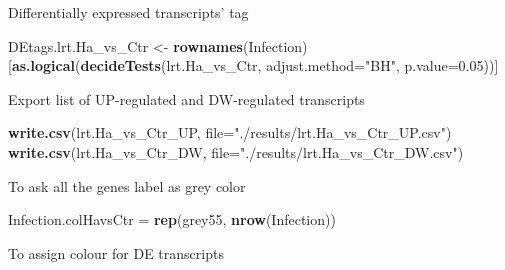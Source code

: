 \documentclass[
]{article}
\newenvironment{Shaded}{\begin{snugshade}}{\end{snugshade}}
\newcommand{\AttributeTok}[1]{\textcolor[rgb]{0.13,0.29,0.53}{#1}}
\newcommand{\DecValTok}[1]{\textcolor[rgb]{0.00,0.00,0.81}{#1}}
\newcommand{\FloatTok}[1]{\textcolor[rgb]{0.00,0.00,0.81}{#1}}
\newcommand{\FunctionTok}[1]{\textcolor[rgb]{0.13,0.29,0.53}{\textbf{#1}}}
\newcommand{\NormalTok}[1]{#1}
\newcommand{\OtherTok}[1]{\textcolor[rgb]{0.56,0.35,0.01}{#1}}
\newcommand{\SpecialCharTok}[1]{\textcolor[rgb]{0.81,0.36,0.00}{\textbf{#1}}}
\newcommand{\StringTok}[1]{\textcolor[rgb]{0.31,0.60,0.02}{#1}}
\begin{document}
Differentially expressed transcripts' tag

\begin{Shaded}
\begin{Highlighting}[]
\NormalTok{DEtags.lrt.Ha\_vs\_Ctr }\OtherTok{\textless{}{-}} \FunctionTok{rownames}\NormalTok{(Infection)[}\FunctionTok{as.logical}\NormalTok{(}\FunctionTok{decideTests}\NormalTok{(lrt.Ha\_vs\_Ctr, }\AttributeTok{adjust.method=}\StringTok{"BH"}\NormalTok{, }\AttributeTok{p.value=}\FloatTok{0.05}\NormalTok{))]}
\end{Highlighting}
\end{Shaded}

Export list of UP-regulated and DW-regulated transcripts

\begin{Shaded}
\begin{Highlighting}[]
\FunctionTok{write.csv}\NormalTok{(lrt.Ha\_vs\_Ctr\_UP, }\AttributeTok{file=}\StringTok{"./results/lrt.Ha\_vs\_Ctr\_UP.csv"}\NormalTok{)}
\FunctionTok{write.csv}\NormalTok{(lrt.Ha\_vs\_Ctr\_DW, }\AttributeTok{file=}\StringTok{"./results/lrt.Ha\_vs\_Ctr\_DW.csv"}\NormalTok{)}
\end{Highlighting}
\end{Shaded}

To ask all the genes label as grey color

\begin{Shaded}
\begin{Highlighting}[]
\NormalTok{Infection.colHavsCtr }\OtherTok{=} \FunctionTok{rep}\NormalTok{(}\StringTok{\textquotesingle{}grey55\textquotesingle{}}\NormalTok{, }\FunctionTok{nrow}\NormalTok{(Infection))}
\end{Highlighting}
\end{Shaded}

To assign colour for DE transcripts

\begin{Shaded}
\end{Shaded}
\end{document}
